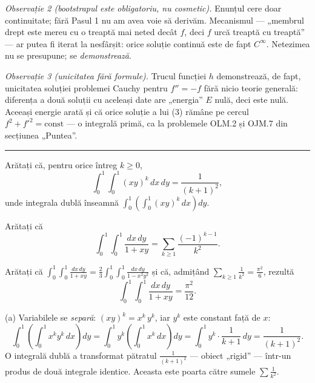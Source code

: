 \emph{Observație 2 (bootstrapul este obligatoriu, nu cosmetic).} Enunțul cere doar continuitate; fără Pasul 1 nu am avea voie să derivăm. Mecanismul --- „membrul drept este mereu cu o treaptă mai neted decât $f$, deci $f$ urcă treaptă cu treaptă'' --- ar putea fi iterat la nesfârșit: orice soluție continuă este de fapt $C^{\infty}$. Netezimea nu se presupune; se \emph{demonstrează}.

\emph{Observație 3 (unicitatea fără formule).} Trucul funcției $h$ demonstrează, de fapt, unicitatea soluției problemei Cauchy pentru $f''=-f$ fără nicio teorie generală: diferența a două soluții cu aceleași date are „energia'' $E$ nulă, deci este nulă. Aceeași energie arată și că orice soluție a lui (3) rămâne pe cercul $f^{2}+f'^{2}=\text{const}$ --- o integrală primă, ca la problemele OLM.2 și OJM.7 din secțiunea „Puntea''.
\vspace{1mm}\hrule

\begin{parti}
  \item Arătați că, pentru orice întreg $k\ge0$,
  \[ \int_{0}^{1}\!\!\int_{0}^{1}(xy)^{k}\,dx\,dy=\frac{1}{(k+1)^{2}} , \]
  unde integrala dublă înseamnă $\displaystyle\int_{0}^{1}\left(\int_{0}^{1}(xy)^{k}\,dx\right)dy$.
  \item Arătați că
  \[ \int_{0}^{1}\!\!\int_{0}^{1}\frac{dx\,dy}{1+xy}=\sum_{k\ge1}\frac{(-1)^{k-1}}{k^{2}} . \]
  \item Arătați că $\displaystyle\int_{0}^{1}\!\!\int_{0}^{1}\frac{dx\,dy}{1+xy}=\frac{2}{3}\int_{0}^{1}\!\!\int_{0}^{1}\frac{dx\,dy}{1-x^{2}y^{2}}$ și că, admițând $\displaystyle\sum_{k\ge1}\frac{1}{k^{2}}=\frac{\pi^{2}}{6}$, rezultă
  \[ \int_{0}^{1}\!\!\int_{0}^{1}\frac{dx\,dy}{1+xy}=\frac{\pi^{2}}{12} . \]
\end{parti}
\sol (a) Variabilele se \emph{separă}: $(xy)^{k}=x^{k}\,y^{k}$, iar $y^{k}$ este constant față de $x$:
\[ \int_{0}^{1}\left(\int_{0}^{1}x^{k}y^{k}\,dx\right)dy=\int_{0}^{1}y^{k}\left(\int_{0}^{1}x^{k}\,dx\right)dy=\int_{0}^{1}y^{k}\cdot\frac{1}{k+1}\,dy=\frac{1}{(k+1)^{2}} . \]
O integrală dublă a transformat pătratul $\frac{1}{(k+1)^{2}}$ --- obiect „rigid'' --- într-un produs de două integrale identice. Aceasta este poarta către sumele $\sum\frac{1}{k^{2}}$.

